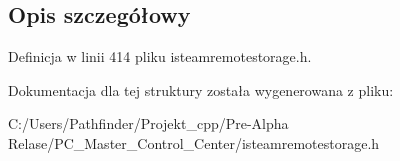 \subsection{Opis szczegółowy}


Definicja w linii 414 pliku isteamremotestorage.\+h.



Dokumentacja dla tej struktury została wygenerowana z pliku\+:\begin{DoxyCompactItemize}
\item 
C\+:/\+Users/\+Pathfinder/\+Projekt\+\_\+cpp/\+Pre-\/\+Alpha Relase/\+P\+C\+\_\+\+Master\+\_\+\+Control\+\_\+\+Center/isteamremotestorage.\+h\end{DoxyCompactItemize}
